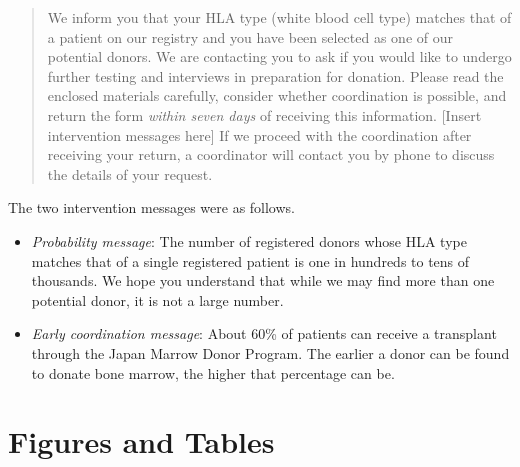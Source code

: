 \documentclass[12pt, a4paper]{article}
\providecommand{\tightlist}{%
  \setlength{\itemsep}{0pt}\setlength{\parskip}{0pt}}
\begin{document}
\begin{quote}
We inform you that your HLA type (white blood cell type) matches that of a patient on our registry and you have been selected as one of our potential donors. We are contacting you to ask if you would like to undergo further testing and interviews in preparation for donation. Please read the enclosed materials carefully, consider whether coordination is possible, and return the form \emph{within seven days} of receiving this information. {[}Insert intervention messages here{]} If we proceed with the coordination after receiving your return, a coordinator will contact you by phone to discuss the details of your request.
\end{quote}

The two intervention messages were as follows.

\begin{itemize}
\tightlist
\item
  \emph{Probability message}: The number of registered donors whose HLA type matches that of a single registered patient is one in hundreds to tens of thousands. We hope you understand that while we may find more than one potential donor, it is not a large number.
\item
  \emph{Early coordination message}: About 60\% of patients can receive a transplant through the Japan Marrow Donor Program. The earlier a donor can be found to donate bone marrow, the higher that percentage can be.
\end{itemize}

\setcounter{figure}{0}
\setcounter{table}{0}
\renewcommand\thefigure{\thesection\arabic{figure}}
\renewcommand{\thetable}{\thesection\arabic{table}}
\renewcommand{\theHfigure}{\thesection\arabic{figure}}
\renewcommand{\theHtable}{\thesection\arabic{table}}

\hypertarget{figtab}{%
\section{Figures and Tables}\label{figtab}}
\end{document}
